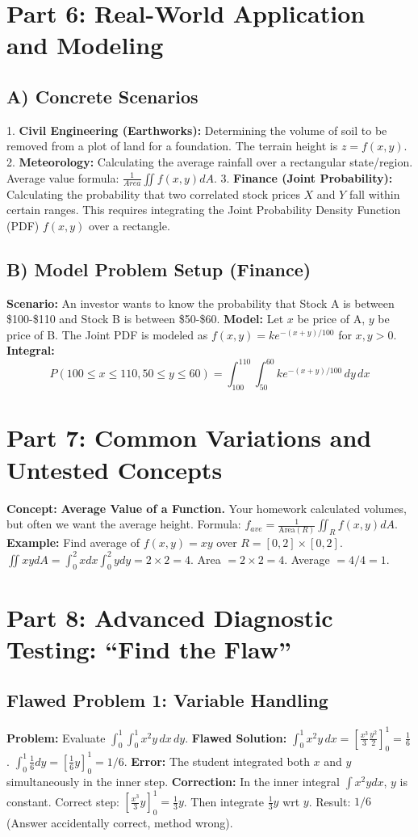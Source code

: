 \documentclass[11pt,a4paper]{article}
\begin{document}
\section{Part 6: Real-World Application and Modeling}
\subsection{A) Concrete Scenarios}
1. \textbf{Civil Engineering (Earthworks):} Determining the volume of soil to be removed from a plot of land for a foundation. The terrain height is $z=f(x,y)$.
2. \textbf{Meteorology:} Calculating the average rainfall over a rectangular state/region. Average value formula: $\frac{1}{Area} \iint f(x,y) dA$.
3. \textbf{Finance (Joint Probability):} Calculating the probability that two correlated stock prices $X$ and $Y$ fall within certain ranges. This requires integrating the Joint Probability Density Function (PDF) $f(x,y)$ over a rectangle.

\subsection{B) Model Problem Setup (Finance)}
\textbf{Scenario:} An investor wants to know the probability that Stock A is between \$100-\$110 and Stock B is between \$50-\$60.
\textbf{Model:} Let $x$ be price of A, $y$ be price of B.
The Joint PDF is modeled as $f(x,y) = k e^{-(x+y)/100}$ for $x,y > 0$.
\textbf{Integral:}
\[ P(100 \le x \le 110, 50 \le y \le 60) = \int_{100}^{110} \int_{50}^{60} k e^{-(x+y)/100} \, dy \, dx \]

\section{Part 7: Common Variations and Untested Concepts}
\textbf{Concept:} \textbf{Average Value of a Function.}
Your homework calculated volumes, but often we want the average height.
Formula: $f_{ave} = \frac{1}{\text{Area}(R)} \iint_R f(x,y) dA$.
\textbf{Example:} Find average of $f(x,y)=xy$ over $R=[0,2]\times[0,2]$.
$\iint xy dA = \int_0^2 x dx \int_0^2 y dy = 2 \times 2 = 4$.
Area $= 2 \times 2 = 4$.
Average $= 4/4 = 1$.

\section{Part 8: Advanced Diagnostic Testing: ``Find the Flaw''}

\subsection*{Flawed Problem 1: Variable Handling}
\textbf{Problem:} Evaluate $\int_0^1 \int_0^1 x^2 y \, dx \, dy$.
\textbf{Flawed Solution:}
$\int_0^1 x^2 y \, dx = [\frac{x^3}{3} \frac{y^2}{2}]_0^1 = \frac{1}{6}$.
$\int_0^1 \frac{1}{6} dy = [\frac{1}{6}y]_0^1 = 1/6$.
\textbf{Error:} The student integrated both $x$ and $y$ simultaneously in the inner step.
\textbf{Correction:} In the inner integral $\int x^2 y dx$, $y$ is constant. Correct step: $[ \frac{x^3}{3}y ]_0^1 = \frac{1}{3}y$. Then integrate $\frac{1}{3}y$ wrt $y$. Result: $1/6$ (Answer accidentally correct, method wrong).
\end{document}
